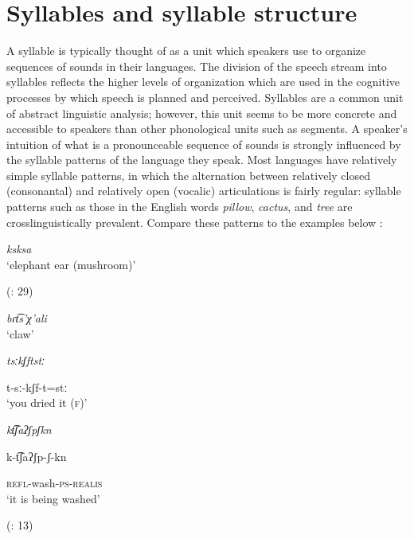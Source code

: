 \chapter{Syllables and syllable structure}\label{sec:1}

  A syllable is typically thought of as a unit which speakers use to organize sequences of sounds in their languages. The division of the speech stream into syllables reflects the higher levels of organization which are used in the cognitive processes by which speech is planned and perceived. Syllables are a common unit of abstract linguistic analysis; however, this unit seems to be more concrete and accessible to speakers than other phonological units such as segments. A speaker’s intuition of what is a pronounceable sequence of sounds is strongly influenced by the syllable patterns of the language they speak. Most languages have relatively simple syllable patterns, in which the alternation between relatively closed (consonantal) and relatively open (vocalic) articulations is fairly regular: syllable patterns such as those in the English words \textit{pillow}, \textit{cactus}, and \textit{tree} are crosslinguistically prevalent. Compare these patterns to the examples below :

\ea\label{ex:1.1}

\textit{ksksa}\\
\glt ‘elephant ear (mushroom)’

(\citealt{HargusBeavert2006}: 29)
\z

\ea\label{ex:1.2}

\textit{bɾt͡s’χ’ali}\\
\glt ‘claw’
\citep[204]{Butskhrikidze2002}
\z

\ea\label{ex:1.3}

\textit{tsːkʃftstː}

t-sː-kʃf-t=stː\\
\glt ‘you dried it (\textsc{f})’
\citep[332]{Ridouane2008}
\z

\ea\label{ex:1.4}

\textit{kt͡ʃaʔʃpʃkn}

k-t͡ʃaʔʃp-ʃ-kn

\textsc{refl}-wash-\textsc{ps-realis}\\
\glt ‘it is being washed’

(\citealt{FernándezGarayHernández2006}: 13)
\z

